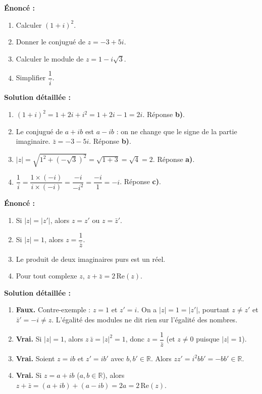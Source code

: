 \documentclass[11pt]{article}
\begin{document}
\begin{corrige}
\textbf{Énoncé :}
\begin{enumerate}
\item Calculer $(1+i)^2$.
\item Donner le conjugué de $z = -3+5i$.
\item Calculer le module de $z = 1 - i\sqrt{3}$.
\item Simplifier $\dfrac{1}{i}$.
\end{enumerate}
\tcblower
\textbf{Solution détaillée :}
\begin{enumerate}
\item $(1+i)^2 = 1 + 2i + i^2 = 1 + 2i - 1 = 2i$. Réponse \textbf{b)}.
\item Le conjugué de $a+ib$ est $a-ib$ : on ne change que le signe de la partie imaginaire. $\bar{z} = -3-5i$. Réponse \textbf{b)}.
\item $|z| = \sqrt{1^2 + (-\sqrt{3})^2} = \sqrt{1+3} = \sqrt{4} = 2$. Réponse \textbf{a)}.
\item $\dfrac{1}{i} = \dfrac{1 \times (-i)}{i \times (-i)} = \dfrac{-i}{-i^2} = \dfrac{-i}{1} = -i$. Réponse \textbf{c)}.
\end{enumerate}
\end{corrige}

\begin{corrige}
\textbf{Énoncé :}
\begin{enumerate}
\item Si $|z| = |z'|$, alors $z = z'$ ou $z = \bar{z}'$.
\item Si $|z| = 1$, alors $z = \dfrac{1}{\bar{z}}$.
\item Le produit de deux imaginaires purs est un réel.
\item Pour tout complexe $z$, $z + \bar{z} = 2\,\mathrm{Re}(z)$.
\end{enumerate}
\tcblower
\textbf{Solution détaillée :}
\begin{enumerate}
\item \textbf{Faux.} Contre-exemple : $z = 1$ et $z' = i$. On a $|z| = 1 = |z'|$, pourtant $z \neq z'$ et $\bar{z}' = -i \neq z$. L'égalité des modules ne dit rien sur l'égalité des nombres.
\item \textbf{Vrai.} Si $|z| = 1$, alors $z\,\bar{z} = |z|^2 = 1$, donc $z = \dfrac{1}{\bar{z}}$ (et $z \neq 0$ puisque $|z|=1$).
\item \textbf{Vrai.} Soient $z = ib$ et $z' = ib'$ avec $b, b' \in \mathbb{R}$. Alors $zz' = i^2 bb' = -bb' \in \mathbb{R}$.
\item \textbf{Vrai.} Si $z = a+ib$ ($a, b \in \mathbb{R}$), alors $z + \bar{z} = (a+ib) + (a-ib) = 2a = 2\,\mathrm{Re}(z)$.
\end{enumerate}
\end{corrige}
\end{document}
